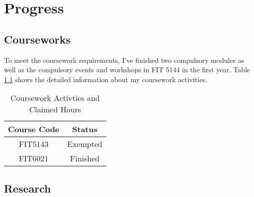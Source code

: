 \chapter{Progress}
\section{Courseworks}
To meet the coursework requirements, I've finished two compulsory modules as well as the compulsory events and workshops in FIT 5144 in the first year. Table \ref{tlb:coursework} shows the detailed information about my coursework activities.

\begin{table}[h]
\centering
\begin{tabular}{|c|c|}
\hline
\bf Course Code & \bf Status \\ \hline
FIT5143 & Exempted \\ \hline
FIT6021 & Finished \\
\hline
\end{tabular}
\caption{Coursework Activties and Claimed Hours}
\label{tlb:coursework}
\end{table}

\section{Research}